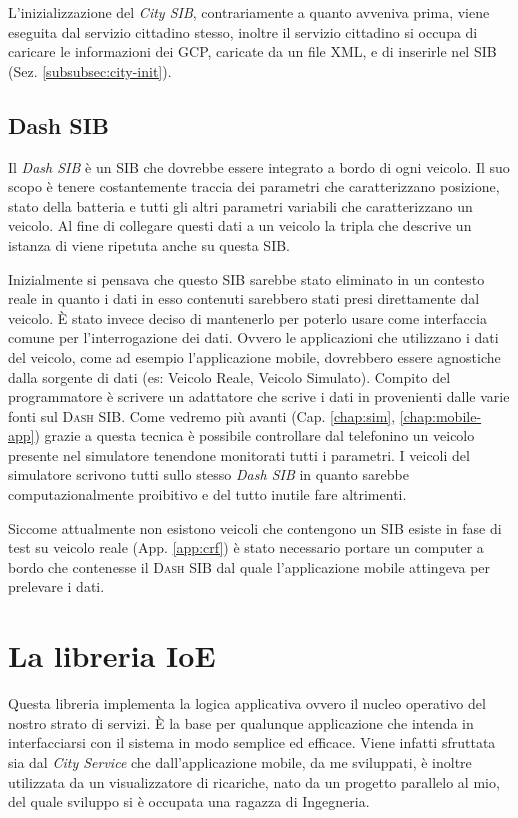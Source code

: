 L'inizializzazione del \emph{City SIB}, contrariamente a quanto avveniva prima, viene eseguita dal servizio cittadino stesso, inoltre il servizio cittadino si occupa di caricare le informazioni dei GCP, caricate da un file XML, e di inserirle nel SIB (Sez. \ref{subsubsec:city-init}).


\subsection{Dash SIB}\label{subsec:dash-sib}

Il \emph{Dash SIB} è  un SIB che dovrebbe essere integrato a bordo di ogni veicolo. Il suo scopo è tenere costantemente traccia dei parametri che caratterizzano posizione, stato della batteria e tutti gli altri parametri variabili che caratterizzano un veicolo. Al fine di collegare questi dati a un veicolo la tripla che descrive un istanza di  viene ripetuta anche su questa SIB. 

Inizialmente si pensava che questo SIB sarebbe stato eliminato in un contesto reale in quanto i dati in esso contenuti sarebbero stati presi direttamente dal veicolo. È stato invece deciso di mantenerlo per poterlo usare come interfaccia comune per l'interrogazione dei dati. Ovvero le applicazioni che utilizzano i dati del veicolo, come ad esempio l'applicazione mobile, dovrebbero essere agnostiche dalla sorgente di dati (es: Veicolo Reale, Veicolo Simulato). Compito del programmatore è scrivere un adattatore che scrive i dati in provenienti dalle varie fonti sul \textsc{Dash SIB}. Come vedremo più avanti (Cap. \ref{chap:sim}, \ref{chap:mobile-app}) grazie a questa tecnica è possibile controllare dal telefonino un veicolo presente nel simulatore tenendone monitorati tutti i parametri. I veicoli del simulatore scrivono tutti sullo stesso \emph{Dash SIB} in quanto sarebbe computazionalmente proibitivo e del tutto inutile fare altrimenti.

Siccome attualmente non esistono veicoli che contengono un SIB esiste in fase di test su veicolo reale (App. \ref{app:crf}) è stato necessario portare un computer a bordo che contenesse il \textsc{Dash SIB} dal quale l'applicazione mobile attingeva per prelevare i dati.

\section{La libreria IoE}\label{subsec:ioe-lib}

Questa libreria implementa la logica applicativa ovvero il nucleo operativo del nostro strato di servizi. È la base per qualunque applicazione che intenda in interfacciarsi con il sistema in modo semplice ed efficace. Viene infatti sfruttata sia dal \emph{City Service} che dall'applicazione mobile, da me sviluppati, è inoltre utilizzata da un visualizzatore di ricariche, nato da un progetto parallelo al mio, del quale sviluppo si è occupata una ragazza di Ingegneria.

